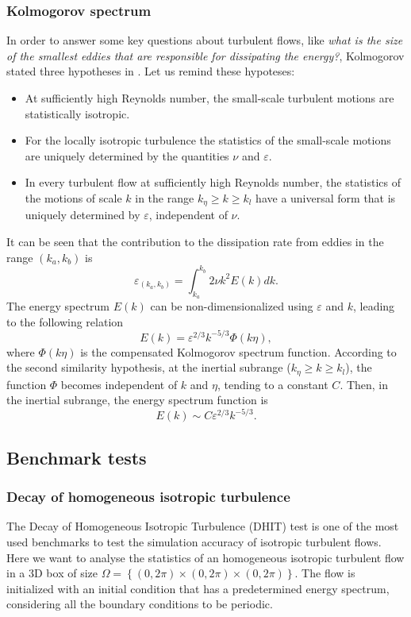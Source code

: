 \subsubsection{Kolmogorov spectrum}
\label{subsubsec-Kolmogorov_spectrum}
In order to answer some key questions about turbulent flows, like \textit{what is the size of the smallest eddies that are responsible for dissipating the energy?}, Kolmogorov stated three hypotheses in \cite{kolmogorov_local_1941}. Let us remind these hypoteses:
\begin{itemize}
\item{} At sufficiently high Reynolds number, the small-scale turbulent motions are statistically isotropic.
\item{} For the locally isotropic turbulence the statistics of the small-scale motions are uniquely determined by the quantities $ \nu $ and $ \varepsilon $.
\item{} In every turbulent flow at sufficiently high Reynolds number, the statistics of the motions of scale $ k $ in the range $ k_\eta\ge k\ge k_l $ have a universal form that is uniquely determined by $ \varepsilon $, independent of $ \nu $.
\end{itemize}

It can be seen that the contribution to the dissipation rate from eddies in the range $ (k_a,k_b) $ is
$$ \varepsilon_{(k_a,k_b)} = \int_{k_a}^{k_b}2\nu k^2E(k)dk.$$
The energy spectrum $ E(k) $ can be non-dimensionalized using $ \varepsilon $ and $ k $, leading to the following relation
$$ E(k) = \varepsilon^{2/3}k^{-5/3}\Phi(k\eta), $$ where $ \Phi(k\eta) $ is the compensated Kolmogorov spectrum function. According to the second similarity hypothesis, at the inertial subrange ($ k_\eta\ge k\ge k_l $), the function $ \Phi $ becomes independent of $ k $ and $ \eta $, tending to a constant $ C $. Then, in the inertial subrange, the energy spectrum function is
\begin{equation}
\label{eq-kolmogorov_spectrum}
E(k)\sim C\varepsilon^{2/3}k^{-5/3}.
\end{equation}

\subsection{Benchmark tests}
\label{subsec-isotropic_tests}

\subsubsection{Decay of homogeneous isotropic turbulence}
\label{subsubsec-C3_DHIT}
The Decay of Homogeneous Isotropic Turbulence (DHIT) test is one of the most used benchmarks to test the simulation accuracy of isotropic turbulent flows. Here we want to analyse the statistics of an homogeneous isotropic turbulent flow in a 3D box of size $\Omega=\left\{(0,2\pi)\times(0,2\pi)\times(0,2\pi)\right\}$. The flow is initialized with an initial condition that has a predetermined energy spectrum, considering all the boundary conditions to be periodic.

